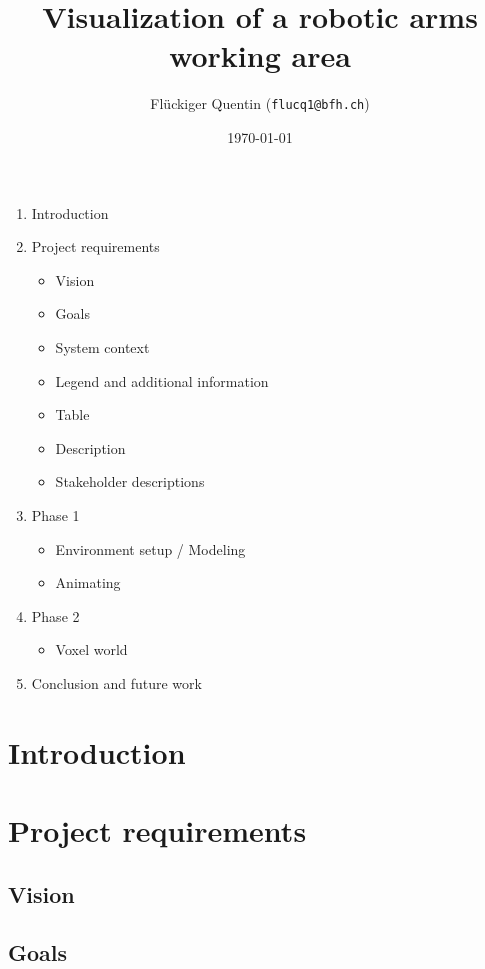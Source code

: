 \documentclass{scrartcl}
\begin{document}
\title{Visualization of a robotic arms working area}
\date{\today}   %
\author{Flückiger Quentin (\texttt{flucq1@bfh.ch}) }

\clearpage
\maketitle
\tableofcontents
\begin{enumerate}
  \item Introduction
  \item Project requirements
  \begin{itemize}
    \item Vision
    \item Goals
    \item System context
    \item Legend and additional information
    \item Table
    \item Description
    \item Stakeholder descriptions
  \end{itemize}
  \item Phase 1
  \begin{itemize}
    \item Environment setup / Modeling
    \item Animating
  \end{itemize}
  \item Phase 2
  \begin{itemize}
    \item Voxel world
  \end{itemize}
  \item Conclusion and future work
\end{enumerate}

\clearpage

\section{Introduction}

\clearpage

\section{Project requirements}
\subsection{Vision}
\subsection{Goals}
\end{document}
